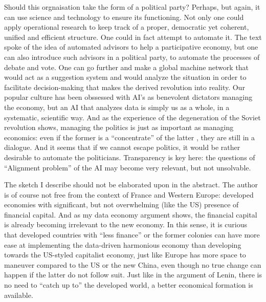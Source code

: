 \documentclass{article}
\begin{document}
Should this orgnaisation take the form of a political party? Perhaps, but again, it
can use science and technology to ensure its functioning. Not only one could apply
operational research \cite{BEER} to keep track of a proper, democratic yet coherent,
unified and efficient structure. One could in fact attempt to automate it. The text \cite{DWIT}
spoke of the idea of automated advisors to help a participative economy, but one can also
introduce such advisors in a political party, to automate the processes of debate and
vote. One can go further and make a global machine network that would act as a
suggestion system and would analyze the situation in order to facilitate decision-making
that makes the derived revolution into reality. Our popular culture has been obssessed
with AI's as benevolent dictators managing the economy, but an AI that analyzes
data is simply us as a whole, in a systematic, scientific way. And as the experience
of the degeneration of the Soviet revolution shows, managing the politics is just as
important as managing economics: even if the former is a ``concentrate'' of the latter \cite{LENIN},
they are still in a dialogue. And it seems that if we cannot escape politics, it would
be rather desirable to automate the politicians. Transparency is key here: the questions
of ``Alignment problem'' of the AI may become very relevant, but not unsolvable.

The sketch I describe should not be elaborated upon in the abstract. The author is of course
not free from the context of France and Western Europe: developed economies with significant, but not
overwhelming (like the US) presence of financial capital. And as my data economy argument
shows, the financial capital is already becoming irrelevant to the new economy. In this sense,
it is curious that developed countries with ``less finance'' or the former colonies can have
more ease at implementing the data-driven harmonious economy than developing towards the US-styled
capitalist economy, just like Europe has more space to maneuver compared to the US or the new China, even though
no true change can happen if the latter do not follow suit.
Just like in the argument of Lenin, there is no need to ``catch up to'' the developed
world, a better economical formation is available.
\end{document}
